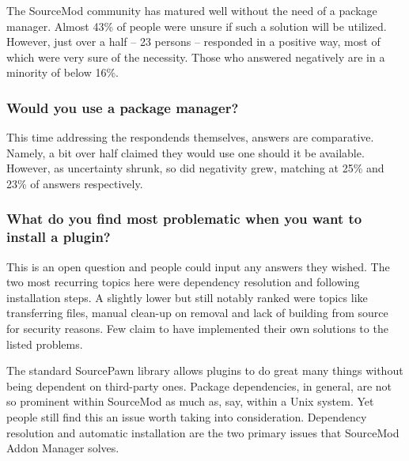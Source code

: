 The SourceMod community has matured well without the need of a package manager.
Almost 43\% of people were unsure if such a solution will be utilized.
However, just over a half -- 23 persons -- responded in a positive way, most of which were very sure of the necessity.
Those who answered negatively are in a minority of below 16\%.

\subsubsection{Would you use a package manager?}

\begin{figure}[H]
  \centering
\end{figure}

This time addressing the respondends themselves, answers are comparative.
Namely, a bit over half claimed they would use one should it be available.
However, as uncertainty shrunk, so did negativity grew, matching at 25\% and 23\% of answers respectively.

\subsubsection{What do you find most problematic when you want to install a plugin?}

This is an open question and people could input any answers they wished.
The two most recurring topics here were dependency resolution and following installation steps.
A slightly lower but still notably ranked were topics like transferring files, manual clean-up on removal and lack of building from source for security reasons.
Few claim to have implemented their own solutions to the listed problems.

The standard SourcePawn library allows plugins to do great many things without being dependent on third-party ones.
Package dependencies, in general, are not so prominent within SourceMod as much as, say, within a Unix system.
Yet people still find this an issue worth taking into consideration.
Dependency resolution and automatic installation are the two primary issues that SourceMod Addon Manager solves.

